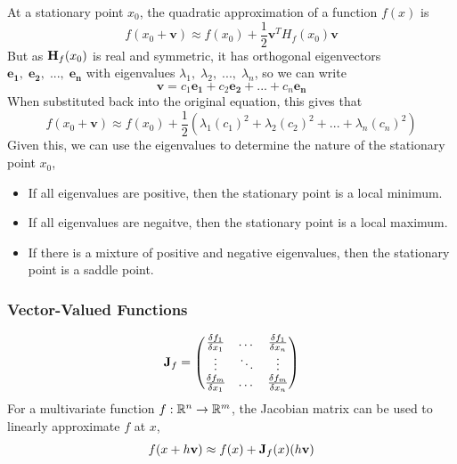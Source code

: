 At a stationary point \(x_0\), the quadratic approximation of a function \(f(x)\) is
\begin{equation}
    f(x_0 + \mathbf{v}) \approx f(x_0) + \frac{1}{2}\mathbf{v}^T H_f(x_0)\mathbf{v}
\end{equation}
But as \(\mathbf{H}_{f}(x_0)\) is real and symmetric, it has orthogonal eigenvectors \(\mathbf{e_1},\;\mathbf{e_2},\;...,\;\mathbf{e_n}\) with eigenvalues \(\lambda_1,\;\lambda_2,\;...,\;\lambda_n\), so we can write
\begin{equation}
    \mathbf{v} = c_1\mathbf{e_1} + c_2\mathbf{e_2} + ... + c_n\mathbf{e_n}
\end{equation}
When substituted back into the original equation, this gives that
\begin{equation}
    f(x_0 + \mathbf{v}) \approx f(x_0) + \frac{1}{2}\left(\lambda_1(c_1)^2 + \lambda_2(c_2)^2 + ... + \lambda_n(c_n)^2\right)
\end{equation}
Given this, we can use the eigenvalues to determine the nature of the stationary point \(x_0\),
\begin{itemize}
    \item If all eigenvalues are positive, then the stationary point is a local minimum.
    \item If all eigenvalues are negaitve, then the stationary point is a local maximum.
    \item If there is a mixture of positive and negative eigenvalues, then the stationary point is a saddle point.
\end{itemize}

\subsubsection{Vector-Valued Functions}


\begin{equation}
    \mathbf{J}_{f} = \begin{pmatrix}
        \frac{\delta f_1}{\delta x_1} & \dots & \frac{\delta f_1}{\delta x_n} \\
        \vdots & \ddots & \vdots \\
        \frac{\delta f_m}{\delta x_1} & \dots & \frac{\delta f_m}{\delta x_n} \\
    \end{pmatrix}
\end{equation}
For a multivariate function \(f:\mathbb{R}^n\rightarrow\mathbb{R}^m\), the Jacobian matrix can be used to linearly approximate \(f\) at \(x\),
\begin{equation}
    f(x + h\mathbf{v}) \approx f(x) + \mathbf{J}_{f}(x)(h\mathbf{v})
\end{equation} 


